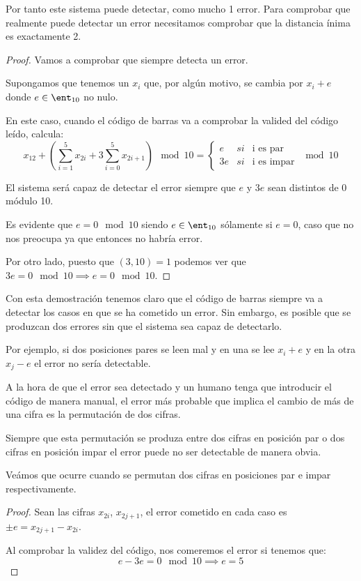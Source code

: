 Por tanto este sistema puede detectar, como mucho 1 error. Para comprobar que realmente puede detectar un error necesitamos comprobar que la distancia ínima es exactamente 2.

\begin{proof}
Vamos a comprobar que siempre detecta un error.

Supongamos que tenemos un $x_i$ que, por algún motivo, se cambia por $x_i+e$ donde $e\in \ent_{10}$ no nulo.

En este caso, cuando el código de barras va a comprobar la valided del código leído, calcula:
\[x_{12}+\left(\sum_{i=1}^5x_{2i}+ 3 \sum_{i=0}^5x_{2i+1} \right)\mod 10 =  \left\{\begin{array}{lll}e & si & \text{i es par} \\ 3e & si & \text{i es impar}\end{array}\right. \mod 10\]

El sistema será capaz de detectar el error siempre que $e$ y $3e$ sean distintos de 0 módulo 10.

Es evidente que $e=0 \mod 10$ siendo $e \in \ent_{10}$ sólamente si $e=0$, caso que no nos preocupa ya que entonces no habría error.

Por otro lado, puesto que $(3,10)=1$ podemos ver que $3e = 0 \mod 10 \implies e=0 \mod 10$.
\end{proof}

Con esta demostración tenemos claro que el código de barras siempre va a detectar los casos en que se ha cometido un error. Sin embargo, es posible que se produzcan dos errores sin que el sistema sea capaz de detectarlo.

Por ejemplo, si dos posiciones pares se leen mal y en una se lee $x_i+e$ y en la otra $x_j-e$ el error no sería detectable.

A la hora de que el error sea detectado y un humano tenga que introducir el código de manera manual, el error más probable que implica el cambio de más de una cifra es la permutación de dos cifras.

Siempre que esta permutación se produza entre dos cifras en posición par o dos cifras en posición impar el error puede no ser detectable de manera obvia.

Veámos que ocurre cuando se permutan dos cifras en posiciones par e impar respectivamente.

\begin{proof}

Sean las cifras $x_{2i}$, $x_{2j+1}$, el error cometido en cada caso es $\pm e=x_{2j+1}-x_{2i}$.

Al comprobar la validez del código, nos comeremos el error si tenemos que:
\[e-3e = 0 \mod 10 \implies e=5\]
\end{proof}

